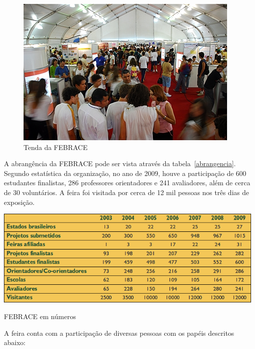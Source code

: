     \begin{figure}
        \begin{center}
    \includegraphics[width=1.0\linewidth]{arquivos/febrace.jpg}
        \end{center}
        \caption{Tenda da FEBRACE}
        \label{febrace}
    \end{figure}

A abrangência da FEBRACE pode ser vista através da tabela~\ref{abrangencia}. Segundo estatística da organização, no ano de 2009, houve a participação de 600 estudantes finalistas, 286 professores orientadores e 241 avaliadores, além de cerca de 30 voluntários. A feira foi visitada por cerca de 12 mil pessoas nos três dias de exposição. 

\begin{table}[h]
    \begin{center}
        \includegraphics[width=0.8\linewidth]{arquivos/abrangencia.png}
    \end{center}
    \caption{FEBRACE em números}
    \label{abrangencia}
\end{table}

A feira conta com a participação de diversas pessoas com os papéis descritos abaixo:

